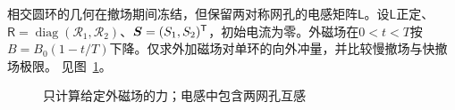 \begin{example}[撤场时间与外磁场冲量（选做）]\label{ex:i4-e14}

相交圆环的几何在撤场期间冻结，但保留两对称网孔的电感矩阵$\mathsf L$。设$\mathsf L$正定、$\mathsf R=\operatorname{diag}(\mathcal R_1,\mathcal R_2)$、$\bm{S}=(S_1,S_2)^{\mathsf T}$，初始电流为零。外磁场在$0<t<T$按$B=B_0(1-t/T)$下降。仅求外加磁场对单环的向外冲量，并比较慢撤场与快撤场极限。
 见图~\ref{fig:i4-e14-q}。
\end{example}

\begin{figure}[H]\centering
{}
\caption{只计算给定外磁场的力；电感中包含两网孔互感}\label{fig:i4-e14-q}
\end{figure}
